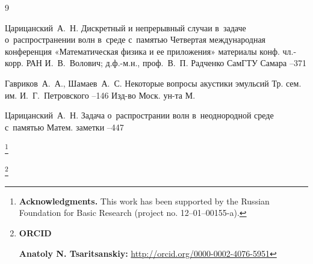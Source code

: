 \begin{thebibliography}{9}

\by Царицанский~А.~Н. 
\paper Дискретный и непрерывный случаи в~задаче о~распространении волн в~среде с~памятью 
\inbook Четвертая международная конференция «Математическая физика и ее приложения»
\bookinfo материалы конф.
\eds чл.-корр. РАН И.~В.~Волович; д.ф.-м.н., проф.~В.~П. Радченко
\publaddr СамГТУ
\publ Самара
--371

\by Гавриков~А.~А., Шамаев~А.~С.
\paper Некоторые вопросы акустики эмульсий
\serial Тр. сем. им. И.~Г.~Петровского
--146
\publ Изд-во Моск. ун-та
\publaddr М.


\by Царицанский~А.~Н.
\paper Задача о~распространии волн в~неоднородной среде с~памятью
\jour Матем. заметки
--447


\end{thebibliography}

\RuDate

\newpage

\makeentitle

\thanks{\textbf{Acknowledgments.} 
This work has been supported by the Russian Foundation for Basic Research (project no.  12–01–00155-a).
}



\thanks{{\bf ORCID}

{\bf Anatoly N. Tsaritsanskiy:}     \url{http://orcid.org/0000-0002-4076-5951}


}

